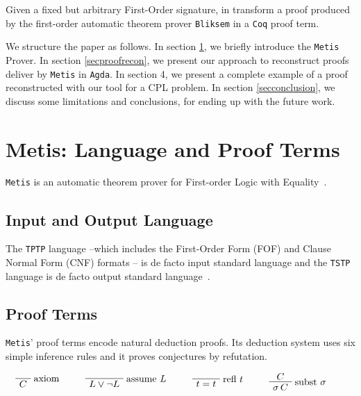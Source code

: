 \documentclass[runningheads,a4paper]{llncs}
\newenvironment{bprooftree}
  {\leavevmode\hbox\bgroup}
  {\DisplayProof\egroup}
\begin{document}
Given a fixed but arbitrary First-Order signature, in \cite{bezem2002automated} transform a proof produced by the first-order automatic theorem prover \verb!Bliksem! \cite{deNivelle2003} in a \verb!Coq! proof term.

We structure the paper as follows. In section \ref{sec2}, we briefly introduce the \verb!Metis! Prover. In section \ref{secproofrecon}, we present our approach to reconstruct proofs deliver by \verb!Metis! in \verb!Agda!. In section 4, we present a complete example of a proof reconstructed with our tool for a CPL problem. In section \ref{secconclusion}, we discuss some limitations and conclusions, for ending up with the future work.

\section{Metis: Language and Proof Terms}\label{sec2}
\verb!Metis! is an automatic theorem prover for First-order Logic with Equality~\cite{hurd2003first}.

\subsection{Input and Output Language}
The \verb!TPTP! language --which includes the First-Order Form (FOF) and Clause Normal Form (CNF) formats \cite{sutcliffe2009} -- is de facto input standard language and the \verb!TSTP! language is de facto output standard language~\cite{sutcliffe2004tstp}.

\subsection{Proof Terms}

\verb!Metis!' proof terms encode natural deduction proofs. Its deduction system uses six simple inference rules and it proves conjectures by refutation.

\[
\begin{bprooftree}
\AxiomC{}
\RightLabel{axiom}
\UnaryInfC{$C$}
\end{bprooftree}
\qquad
\begin{bprooftree}
\AxiomC{}
\RightLabel{assume $L$}
\UnaryInfC{$L \vee \neg L$}
\end{bprooftree}
\qquad
\begin{bprooftree}
\AxiomC{}
\RightLabel{refl $t$}
\UnaryInfC{$t = t$}
\end{bprooftree}
\qquad
\begin{bprooftree}
\AxiomC{$C$}
\RightLabel{subst $\sigma$}
\UnaryInfC{$\sigma\,C$}
\end{bprooftree}
\qquad
\]
\end{document}
